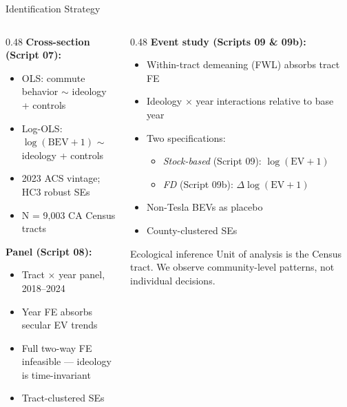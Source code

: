 \documentclass[aspectratio=169,t]{beamer}
\begin{document}
\begin{frame}{Identification Strategy}
  \begin{columns}[T]
    \begin{column}{0.48\textwidth}
      \textbf{Cross-section (Script 07):}
      \begin{itemize}\small
        \item OLS: commute behavior $\sim$ ideology + controls
        \item Log-OLS: $\log(\text{BEV}+1)$ $\sim$ ideology + controls
        \item 2023 ACS vintage; HC3 robust SEs
        \item N = 9,003 CA Census tracts
      \end{itemize}

      \vspace{0.1em}
      \textbf{Panel (Script 08):}
      \begin{itemize}\small
        \item Tract $\times$ year panel, 2018--2024
        \item Year FE absorbs secular EV trends
        \item Full two-way FE infeasible --- ideology is time-invariant
        \item Tract-clustered SEs
      \end{itemize}
    \end{column}
    \begin{column}{0.48\textwidth}
      \textbf{Event study (Scripts 09 \& 09b):}
      \begin{itemize}\small
        \item Within-tract demeaning (FWL) absorbs tract FE
        \item Ideology $\times$ year interactions relative to base year
        \item Two specifications:
          \begin{itemize}\small
            \item \textit{Stock-based} (Script 09): $\log(\text{EV}+1)$
            \item \textit{FD} (Script 09b): $\Delta\log(\text{EV}+1)$
          \end{itemize}
        \item Non-Tesla BEVs as placebo
        \item County-clustered SEs
      \end{itemize}
      \vspace{0.1em}
      \begin{alertblock}{Ecological inference}
        \small Unit of analysis is the Census tract. We observe
        community-level patterns, not individual decisions.
      \end{alertblock}
    \end{column}
  \end{columns}
\end{frame}
\end{document}
